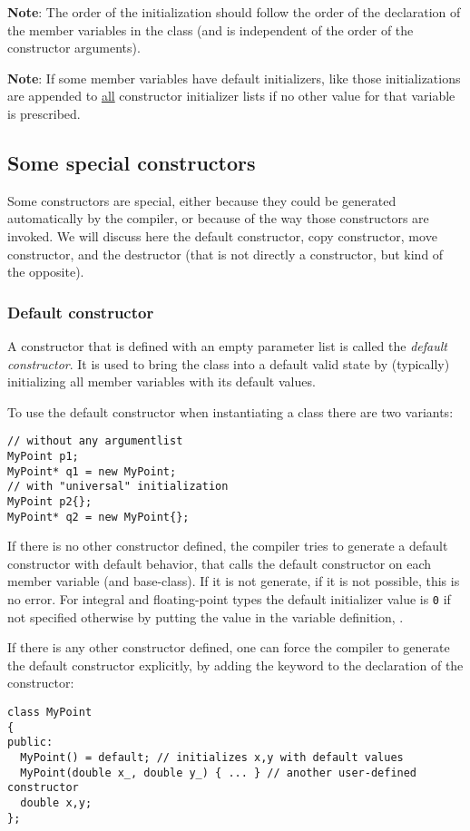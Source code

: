 \textbf{Note}: The order of the initialization should follow the order of the declaration of the member variables in the class (and is independent of the order
of the constructor arguments).

\textbf{Note}: If some member variables have default initializers, like  those initializations are appended to \underline{all} constructor
initializer lists if no other value for that variable is prescribed.


\subsection{Some special constructors}
Some constructors are special, either because they could be generated automatically by the compiler, or because of the way those constructors are invoked. We
will discuss here the default constructor, copy constructor, move constructor, and the destructor (that is not directly a constructor, but kind of the opposite).


\subsubsection{Default constructor}
A constructor that is defined with an empty parameter list is called the \emph{default constructor}. It is used to bring the class into a default valid state
by (typically) initializing all member variables with its default values.

To use the default constructor when instantiating a class there are two variants:
%
\begin{verbatim}
// without any argumentlist
MyPoint p1;
MyPoint* q1 = new MyPoint;
// with "universal" initialization
MyPoint p2{};
MyPoint* q2 = new MyPoint{};
\end{verbatim}

If there is no other constructor defined, the compiler tries to generate a default constructor with default behavior, \ie that calls the default constructor
on each member variable (and base-class). If it is not generate, if it is not possible, this is no error. For integral and floating-point types the default initializer value is \texttt{0} if not specified otherwise by
putting the value in the variable definition, \ie {}.

If there is any other constructor defined, one can force the compiler to generate the default constructor explicitly, by adding the keyword  to
the declaration of the constructor:
%
\begin{verbatim}
class MyPoint
{
public:
  MyPoint() = default; // initializes x,y with default values
  MyPoint(double x_, double y_) { ... } // another user-defined constructor
  double x,y;
};
\end{verbatim}


